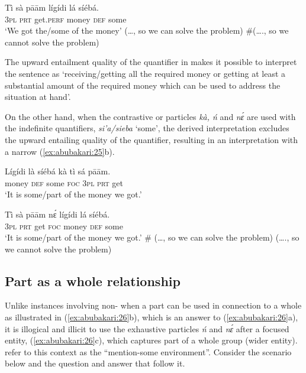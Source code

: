\documentclass[output=paper,modfonts,nonflat,
 hidelinks
]{langsci/langscibook}
\begin{document}
\ea\label{ex:abubakari:24} 
\gll Tì  sà  pāām    lígídi    lá  síébá.\\
3\textsc{pl}  \textsc{prt}  get.\textsc{perf}  money  \textsc{def}  some\\
\glt ‘We got the/some of the money’
\glt (…, so we can solve the problem)
\glt \#(…., so we cannot solve the problem)
\z

The upward entailment quality of the quantifier in  makes it possible to interpret the sentence as ‘receiving/getting all the required money or getting at least a substantial amount of the required money which can be used to address the situation at hand’.

On the other hand, when the contrastive or  particles \textit{kà, ń} and \textit{nɛ́} are used with the indefinite quantifiers, \textit{si’a/sieba} ‘some’, the derived interpretation excludes the upward entailing quality of the quantifier, resulting in an interpretation with a narrow  (\ref{ex:abubakari:25}b).

 
\ea\label{ex:abubakari:25}
\ea\label{ex:abubakari:25a} 
\gll Lígídi  là  síébá  kà  tì  sá  pāām.\\
 money  \textsc{def}  some  \textsc{foc}  3\textsc{pl}  \textsc{prt}  get\\
\glt ‘It is some/part of the money we got.’
 

\ex\label{ex:abubakari:25b} 
\gll Tì  sà  pāām  nɛ́  lígídi    lá  síébá.\\
3\textsc{pl}  \textsc{prt}  get  \textsc{foc}  money  \textsc{def}  some\\
\glt ‘It is some/part of the money we got.’
\glt \# (…, so we can solve the problem)
\glt (…., so we cannot solve the problem)
\z
\z

\subsection{Part as a whole relationship} 

Unlike instances involving non- when a part can be used in connection to a whole as illustrated in (\ref{ex:abubakari:26}b), which is an answer to (\ref{ex:abubakari:26}a), it is illogical and illicit to use the exhaustive particles \textit{ń} and \textit{nɛ́} after a focused entity, (\ref{ex:abubakari:26}c), which captures part of a whole group (wider entity). \citet[253]{hartmann2007} refer to this context as the “mention-some environment”. Consider the scenario below and the question and answer that follow it.
\end{document}
